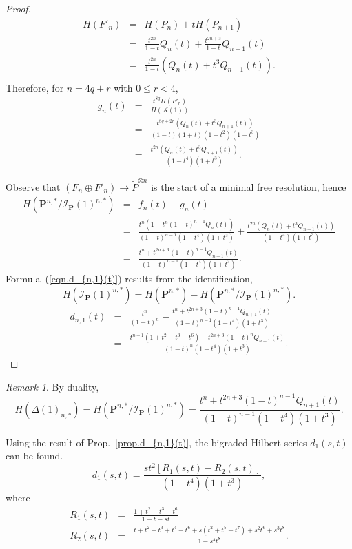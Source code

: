 \documentclass{amsart}
\theoremstyle{plain}
\theoremstyle{definition}
\theoremstyle{remark}
\newtheorem{remark}[theorem]{Remark}
\begin{document}
\begin{proof}
\begin{eqnarray*}
    H(F'_n) &=& H(P_n) + tH(P_{n+1}) \\ &=& \frac{t^{2n}}{1-t} Q_n(t)
    + \frac{t^{2n + 3}}{1-t} Q_{n+1}(t)\\ &=& \frac{t^{2n}}{1-t}\left(
    Q_n(t) + t^3 Q_{n+1}(t) \right).\\
  \end{eqnarray*}
  Therefore, for $n = 4q + r$ with $0 \leq r < 4$,
  \begin{eqnarray*}
    g_n(t) &=& \frac{t^{8q}H(F'_r)}{H(\mathcal{A}(1))}\\ &=&
    \frac{t^{8q+2r}\left( Q_n(t) + t^3 Q_{n+1}(t)
      \right)}{(1-t)(1+t)(1+t^2)(1+t^3)}\\ &=& \frac{t^{2n}\left(
      Q_n(t) + t^3 Q_{n+1}(t) \right)}{(1-t^4)(1+t^3)}.
  \end{eqnarray*}

  Observe that $(F_n \oplus F'_n) \to \widetilde{P}^{\otimes n}$ is
  the start of a minimal free resolution, hence
  \begin{eqnarray*}
    H(\mathbf{P}^{n,*}/ \mathcal{I}_{\mathbf{P}}(1)^{n,*}) &=& f_n(t)
    + g_n(t)\\ &=& \frac{ t^n\left(1 -
      t^{n}(1-t)^{n-1}Q_n(t)\right)}{(1-t)^{n-1}(1-t^4)(1+t^3)} +
    \frac{t^{2n}\left(Q_n(t) + t^3
      Q_{n+1}(t)\right)}{(1-t^4)(1+t^3)}\\ &=& \frac{ t^n +
      t^{2n+3}(1-t)^{n-1}Q_{n+1}(t)}{(1-t)^{n-1}(1-t^4)(1+t^3)}.
  \end{eqnarray*}
  Formula~(\ref{eqn.d_{n,1}(t)}) results from the identification,
  \[
    H(\mathcal{I}_{\mathbf{P}}(1)^{n,*}) = H(\mathbf{P}^{n,*}) -
    H(\mathbf{P}^{n,*}/ \mathcal{I}_{\mathbf{P}}(1)^{n,*}).
  \]
  \begin{eqnarray*}
    d_{n,1}(t) &=& \frac{t^n}{(1-t)^n} - \frac{ t^n +
      t^{2n+3}(1-t)^{n-1}Q_{n+1}(t)}{(1-t)^{n-1}(1-t^4)(1+t^3)}\\ &=&
    \frac{t^{n+1}(1 + t^2 - t^3 - t^6) - t^{2n+3}(1-t)^nQ_{n+1}(t)}
         {(1-t)^n(1-t^4)(1+t^3)}.
  \end{eqnarray*}
\end{proof}
\begin{remark}
  By duality,
  \[
    H(\Delta(1)_{n,*}) = H(\mathbf{P}^{n,*}/
    \mathcal{I}_{\mathbf{P}}(1)^{n,*}) = \frac{ t^n +
      t^{2n+3}(1-t)^{n-1}Q_{n+1}(t)}{(1-t)^{n-1}(1-t^4)(1+t^3)}.
  \]
\end{remark}
Using the result of Prop.~\ref{prop.d_{n,1}(t)}, the bigraded Hilbert
series $d_1(s,t)$ can be found.
\[
  d_1(s,t) = \frac{st^2\left[R_1(s,t) -
      R_2(s,t)\right]}{(1-t^4)(1+t^3)},
\]
where
\begin{eqnarray*}
  R_1(s,t) &=& \frac{1+t^2-t^3-t^6}{1-t-st}\\ R_2(s,t) &=&
  \frac{t+t^2-t^3+t^4-t^6+s(t^2+t^5-t^7) + s^2t^6 + s^3t^8}{1-s^4t^8}.
\end{eqnarray*}
\end{document}
